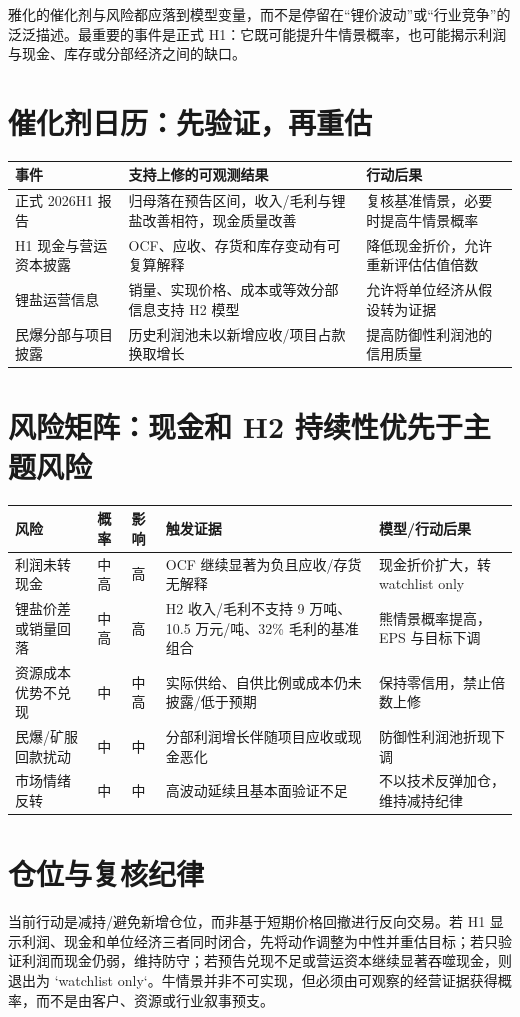 雅化的催化剂与风险都应落到模型变量，而不是停留在“锂价波动”或“行业竞争”的泛泛描述。最重要的事件是正式 H1：它既可能提升牛情景概率，也可能揭示利润与现金、库存或分部经济之间的缺口。

\section{催化剂日历：先验证，再重估}

\begin{exhibitbox}[表 9-1：未来验证事件与行动后果]
\begin{tabularx}{\exhibitboxwidth}{L{3.1cm}X X}
\toprule
事件 & 支持上修的可观测结果 & 行动后果 \\
\midrule
正式 2026H1 报告 & 归母落在预告区间，收入/毛利与锂盐改善相符，现金质量改善 & 复核基准情景，必要时提高牛情景概率 \\
H1 现金与营运资本披露 & OCF、应收、存货和库存变动有可复算解释 & 降低现金折价，允许重新评估估值倍数 \\
锂盐运营信息 & 销量、实现价格、成本或等效分部信息支持 H2 模型 & 允许将单位经济从假设转为证据 \\
民爆分部与项目披露 & 历史利润池未以新增应收/项目占款换取增长 & 提高防御性利润池的信用质量 \\
\bottomrule
\end{tabularx}
\end{exhibitbox}

\section{风险矩阵：现金和 H2 持续性优先于主题风险}

\begin{exhibitbox}[表 9-2：风险、概率与证伪阈值]
\begin{tabularx}{\exhibitboxwidth}{L{2.8cm}L{1.4cm}L{1.4cm}X X}
\toprule
风险 & 概率 & 影响 & 触发证据 & 模型/行动后果 \\
\midrule
利润未转现金 & 中高 & 高 & OCF 继续显著为负且应收/存货无解释 & 现金折价扩大，转 watchlist only \\
锂盐价差或销量回落 & 中高 & 高 & H2 收入/毛利不支持 9 万吨、10.5 万元/吨、32\% 毛利的基准组合 & 熊情景概率提高，EPS 与目标下调 \\
资源成本优势不兑现 & 中 & 中高 & 实际供给、自供比例或成本仍未披露/低于预期 & 保持零信用，禁止倍数上修 \\
民爆/矿服回款扰动 & 中 & 中 & 分部利润增长伴随项目应收或现金恶化 & 防御性利润池折现下调 \\
市场情绪反转 & 中 & 中 & 高波动延续且基本面验证不足 & 不以技术反弹加仓，维持减持纪律 \\
\bottomrule
\end{tabularx}
\end{exhibitbox}

\section{仓位与复核纪律}

当前行动是减持/避免新增仓位，而非基于短期价格回撤进行反向交易。若 H1 显示利润、现金和单位经济三者同时闭合，先将动作调整为中性并重估目标；若只验证利润而现金仍弱，维持防守；若预告兑现不足或营运资本继续显著吞噬现金，则退出为 `watchlist only`。牛情景并非不可实现，但必须由可观察的经营证据获得概率，而不是由客户、资源或行业叙事预支。

